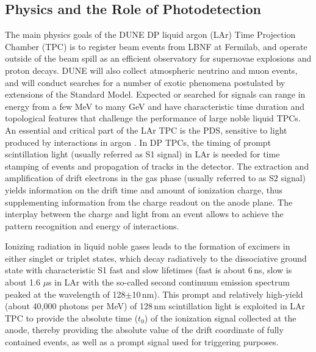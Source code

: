 \subsection{Physics and the Role of Photodetection}
\label{sec:fddp-pd-1.2}

The main physics goals of the DUNE DP liquid argon (LAr) Time Projection Chamber (TPC) is to register beam events from LBNF at Fermilab, and operate outside of the beam spill as an efficient observatory for supernovae explosions and proton decays. DUNE will also collect atmospheric neutrino and muon events, and will conduct searches for a number of exotic phenomena postulated by extensions of the Standard Model.  Expected or searched for signals can range in energy from a few MeV to many GeV and have characteristic time duration and topological features that challenge the performance of large noble liquid TPCs. An essential and critical part of the LAr TPC is the PDS, sensitive to light produced by interactions in argon \cite{Cuesta:2017nrs}. In DP TPCs, the timing of prompt scintillation light (usually referred as S1 signal) in LAr is needed for time stamping of events and propagation of tracks in the detector. The extraction and amplification of drift electrons in the gas phase (usually referred to as S2 signal) yields information on the drift time and amount of ionization charge, thus supplementing information from the charge readout on the anode plane. The interplay between the charge and light from an event allows to achieve the pattern recognition and energy of interactions.

Ionizing radiation in liquid noble gases leads to the formation of excimers in either singlet or triplet states, which decay radiatively to the dissociative ground state with characteristic S1 fast and slow lifetimes (fast is about 6\,ns, slow is about 1.6 $\mu$s in LAr with the so-called second continuum emission spectrum peaked at the wavelength of 128$\pm$10\,nm). This prompt and relatively high-yield (about 40,000 photons per MeV) of 128\,nm scintillation light is exploited in LAr TPC to provide the absolute time ($t_0$) of the ionization signal collected at the anode, thereby providing the absolute value of the drift coordinate of fully contained events, as well as a prompt signal used for triggering purposes.

